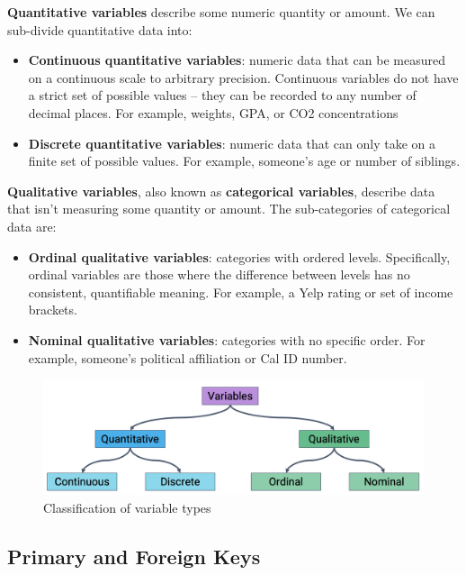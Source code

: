 \documentclass[
  letterpaper,
  DIV=11,
  numbers=noendperiod]{scrreprt}
\providecommand{\tightlist}{%
  \setlength{\itemsep}{0pt}\setlength{\parskip}{0pt}}\usepackage{longtable,booktabs,array}
\begin{document}
\textbf{Quantitative variables} describe some numeric quantity or
amount. We can sub-divide quantitative data into:

\begin{itemize}
\tightlist
\item
  \textbf{Continuous quantitative variables}: numeric data that can be
  measured on a continuous scale to arbitrary precision. Continuous
  variables do not have a strict set of possible values -- they can be
  recorded to any number of decimal places. For example, weights, GPA,
  or CO2 concentrations
\item
  \textbf{Discrete quantitative variables}: numeric data that can only
  take on a finite set of possible values. For example, someone's age or
  number of siblings.
\end{itemize}

\textbf{Qualitative variables}, also known as \textbf{categorical
variables}, describe data that isn't measuring some quantity or amount.
The sub-categories of categorical data are:

\begin{itemize}
\tightlist
\item
  \textbf{Ordinal qualitative variables}: categories with ordered
  levels. Specifically, ordinal variables are those where the difference
  between levels has no consistent, quantifiable meaning. For example, a
  Yelp rating or set of income brackets.
\item
  \textbf{Nominal qualitative variables}: categories with no specific
  order. For example, someone's political affiliation or Cal ID number.
\end{itemize}

\begin{figure}

{\centering \includegraphics{eda/images/variable.png}

}

\caption{Classification of variable types}

\end{figure}

\hypertarget{primary-and-foreign-keys}{%
\subsection{Primary and Foreign Keys}\label{primary-and-foreign-keys}}
\end{document}
